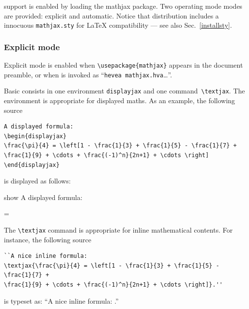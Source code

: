 support is enabled by loading the
\textsf{mathjax} package. Two operating mode modes are provided:
explicit and automatic. Notice that \hevea{} distribution includes a innocuous
\texttt{mathjax.sty} for \LaTeX{} compatibility --- see also Sec.~\ref{installsty}.

\subsubsection{Explicit mode}
%
%
%
%
Explicit mode is enabled when \verb+\usepackage{mathjax}+
appears in the document preamble,
or when \hevea{} is invoked as ``\verb+hevea mathjax.hva+\ldots''.

Basic consists in one environment \texttt{displayjax}
and one command~\verb+\textjax+.
The environment is appropriate for displayed maths.
As an example, the following source
\begin{verbatim}
A displayed formula:
\begin{displayjax}
\frac{\pi}{4} = \left[1 - \frac{1}{3} + \frac{1}{5} - \frac{1}{7} +
\frac{1}{9} + \cdots + \frac{(-1)^n}{2n+1} + \cdots \right]
\end{displayjax}
\end{verbatim}
is displayed as follows:
\begin{divstyle}{show}
A displayed formula:
\begin{displayjax}
 = 
\end{displayjax}
\end{divstyle}

The \verb+\textjax+ command is appropriate for inline mathematical contents.
For instance, the following source
\begin{verbatim}
``A nice inline formula:
\textjax{\frac{\pi}{4} = \left[1 - \frac{1}{3} + \frac{1}{5} - \frac{1}{7} +
\frac{1}{9} + \cdots + \frac{(-1)^n}{2n+1} + \cdots \right]}.''
\end{verbatim}
is typeset as: ``A nice inline formula: .''

